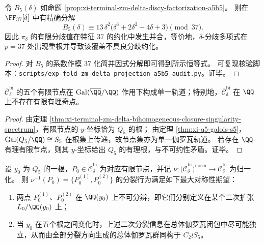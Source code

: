 \begin{proposition}\label{prop:xi-terminal-zm-delta-badprime-37-b5-double-root}
令 \(B_5(\delta)\) 如命题 \ref{prop:xi-terminal-zm-delta-discy-factorization-a5b5}。
则在 \(\FF_{37}[\delta]\) 中有精确分解
\[
B_5(\delta)\equiv 13\,\delta^2\bigl(\delta^3+2\delta^2-4\delta+3\bigr)\pmod{37}.
\]
因此 \(\pi_\delta\) 的有限分歧值在特征 \(37\) 的约化中发生并合，等价地，\(\delta\)-分歧多项式在 \(p=37\) 处出现重根并导致该覆盖不具良分歧约化。
\end{proposition}
\begin{proof}
对 \(B_5\) 的系数作模 \(37\) 化简并因式分解即可得到所示恒等式。
可复现核验脚本：\texttt{scripts/exp\_fold\_zm\_delta\_projection\_a5b5\_audit.py}。证毕。
\end{proof}

\begin{corollary}[有限节点集的伽罗瓦传递性]\label{cor:xi-terminal-zm-delta-nodes-single-galois-orbit}
\(\overline{\mathcal C}_\delta^{\mathrm{bi}}\) 的五个有限节点在 \(\operatorname{Gal}(\overline{\QQ}/\QQ)\) 作用下构成单一轨道；特别地，\(\overline{\mathcal C}_\delta^{\mathrm{bi}}\) 在 \(\QQ\) 上不存在有限有理奇点。
\end{corollary}

\begin{proof}
由定理 \ref{thm:xi-terminal-zm-delta-bihomogeneous-closure-singularity-spectrum}，有限节点的 \(y\)-坐标恰为 \(Q_5\) 的根；
由定理 \ref{thm:xi-q5-galois-s5}，\(\operatorname{Gal}(Q_5/\QQ)\cong S_5\) 在根集上传递，故节点集亦为单一伽罗瓦轨道。
若存在 \(\QQ\)-有理有限节点，则其 \(y\)-坐标给出 \(Q_5\) 的有理根，与不可约性矛盾。证毕。
\end{proof}

\begin{conjecture}[节点分裂方向的最大对称性与花环积结构]\label{conj:xi-terminal-zm-delta-node-splitting-wreath}
设 \(y_0\) 为 \(Q_5\) 的一根，\(P_0\in \overline{\mathcal C}_\delta^{\mathrm{bi}}\) 为对应有限节点，并记 \(\nu:\bigl(\overline{\mathcal C}_\delta^{\mathrm{bi}}\bigr)^{\mathrm{norm}}\to \overline{\mathcal C}_\delta^{\mathrm{bi}}\) 为归一化。
则 \(\nu^{-1}(P_0)=\{P_0^{(1)},P_0^{(2)}\}\) 的分裂行为满足如下最大对称性期望：
\begin{enumerate}
  \item 两点 \(P_0^{(1)}\)、\(P_0^{(2)}\) 在 \(\QQ(y_0)\) 上不可分辨，即它们分别定义在某个二次扩张 \(L_0/\QQ(y_0)\) 上；
  \item 当 \(y_0\) 在五个根之间变化时，上述二次分裂信息在总体伽罗瓦闭包中尽可能独立，从而由全部分裂方向生成的总体伽罗瓦群同构于 \(C_2\wr S_5\)。
\end{enumerate}
\end{conjecture}

\endinput

